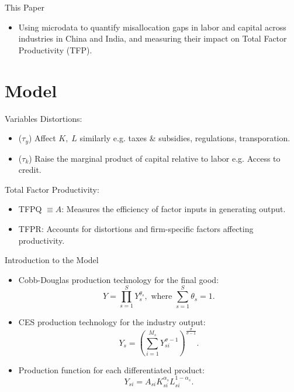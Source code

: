 \documentclass[10pt]{beamer}
\begin{document}
\begin{frame}{This Paper}
\begin{itemize}
    \item Using microdata to quantify misallocation gaps in labor and capital across industries in China and India, and measuring their impact on Total Factor Productivity (TFP).
\end{itemize}
\end{frame}     


\section{Model}

\begin{frame}{Variables}
     Distortions: \begin{itemize}
        \item ($\tau_y$) Affect $K,\;L$ similarly  e.g. taxes \& subsidies, regulations, transporation.
        \item ($\tau_k$) Raise the marginal product of capital relative to labor e.g. Access to credit.
    \end{itemize}
     Total Factor Productivity:\begin{itemize}
        \item TFPQ $\equiv A$: Measures the efficiency of factor inputs in generating output.
        \item TFPR: Accounts for distortions and firm-specific factors affecting productivity.
    \end{itemize}
\end{frame}

\begin{frame}{Introduction to the Model}
    \begin{itemize}
        \item Cobb-Douglas production technology for the final good:
        \begin{equation}
            Y = \prod_{s=1}^{S} Y_s^{\theta_s}, \text{ where } \sum_{s=1}^{S} \theta_s = 1. \label{eq:eqn1}
        \end{equation}
        \item CES production technology for the industry output:
        \begin{equation}
            Y_s = \left( \sum_{i=1}^{M_s} Y_{si}^{\sigma-1} \right)^{\frac{\sigma}{\sigma-1}}.
        \end{equation}
        \item Production function for each differentiated product:
        \begin{equation}
            Y_{si} = A_{si} K_{si}^{\alpha_s} L_{si}^{1-\alpha_s}.
        \end{equation}
    \end{itemize}
\end{frame}
\end{document}
